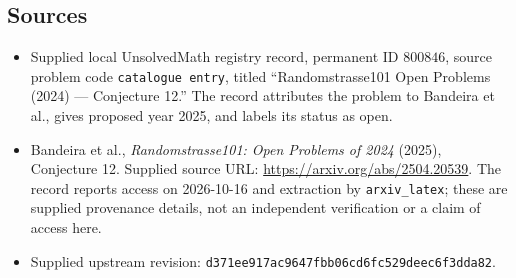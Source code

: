 \documentclass[11pt]{article}
\begin{document}
\subsection{Sources}
\begin{itemize}
\item Supplied local UnsolvedMath registry record, permanent ID \(800846\), source problem code \texttt{catalogue entry}, titled ``Randomstrasse101 Open Problems (2024) --- Conjecture 12.'' The record attributes the problem to Bandeira et al., gives proposed year 2025, and labels its status as open.
\item Bandeira et al., \emph{Randomstrasse101: Open Problems of 2024} (2025), Conjecture 12. Supplied source URL: \url{https://arxiv.org/abs/2504.20539}. The record reports access on 2026-10-16 and extraction by \texttt{arxiv\_latex}; these are supplied provenance details, not an independent verification or a claim of access here.
\item Supplied upstream revision: \texttt{d371ee917ac9647fbb06cd6fc529deec6f3dda82}.
\end{itemize}
\end{document}
